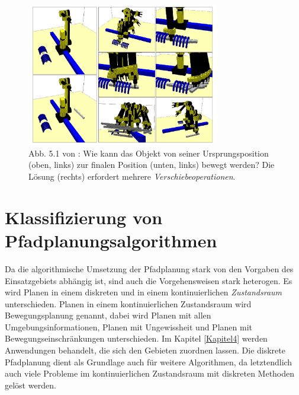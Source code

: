 \begin{figure}
	\centering
	\includegraphics[width=0.75\textwidth]{images/hierarchical.png}
	\caption{Abb. 5.1 von \cite{cortes:03}: Wie kann das Objekt von seiner Ursprungsposition (oben, links) zur finalen Position (unten, links) bewegt werden? Die Lösung (rechts) erfordert mehrere \textit{Verschiebeoperationen}.}
	\label{cortes01}
\end{figure}

\section{Klassifizierung von Pfadplanungsalgorithmen} \label{Kapitel 3.2} 
Da die algorithmische Umsetzung der Pfadplanung stark von den Vorgaben des Einsatzgebiets abhängig ist, sind auch die Vorgehensweisen stark heterogen.
Es wird Planen in einem diskreten und in einem kontinuierlichen \textit{Zustandsraum} unterschieden. Planen in einem kontinuierlichen Zustandsraum wird Bewegungsplanung genannt, dabei wird Planen mit allen Umgebungsinformationen, Planen mit Ungewissheit und Planen mit Bewegungseinschränkungen unterschieden\cite[~S. 24-26]{Lav06}.
Im Kapitel \ref{Kapitel4} werden Anwendungen behandelt, die sich den Gebieten zuordnen lassen. 
 Die diskrete Pfadplanung dient als Grundlage auch für weitere Algorithmen, da letztendlich auch viele Probleme im kontinuierlichen Zustandsraum mit diskreten Methoden gelöst werden\cite[~S. 25]{Lav06}. 

